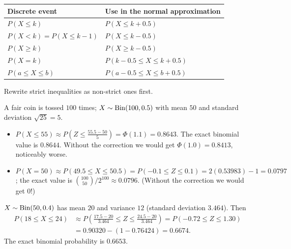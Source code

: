 \begin{important}
\begin{center}
\begin{tabular}{ll}
\toprule
Discrete event & Use in the normal approximation \\
\midrule
$P(X\le k)$ & $P(X\le k+0.5)$ \\
$P(X < k) = P(X\le k-1)$ & $P(X\le k-0.5)$ \\
$P(X\ge k)$ & $P(X\ge k-0.5)$ \\
$P(X = k)$ & $P(k-0.5\le X\le k+0.5)$ \\
$P(a\le X\le b)$ & $P(a-0.5\le X\le b+0.5)$ \\
\bottomrule
\end{tabular}
\end{center}
Rewrite strict inequalities as non-strict ones first.
\end{important}

\begin{example}
A fair coin is tossed $100$ times; $X\sim\operatorname{Bin}(100, 0.5)$ with mean $50$ and standard
deviation $\sqrt{25} = 5$.
\begin{itemize}
  \item $P(X\le55)\approx P\left(Z\le\frac{55.5-50}{5}\right) = \Phi(1.1) = 0.8643$.
        The exact binomial value is $0.8644$. Without the correction we would get
        $\Phi(1.0) = 0.8413$, noticeably worse.
  \item $P(X = 50) \approx P(49.5\le X\le 50.5) = P(-0.1\le Z\le0.1) = 2(0.53983) - 1
        = 0.0797$; the exact value is $\binom{100}{50}/2^{100}\approx 0.0796$. (Without
        the correction we would get $0$!)
\end{itemize}
\end{example}

\begin{example}[An interval]
$X\sim\operatorname{Bin}(50, 0.4)$ has mean $20$ and variance $12$ (standard deviation $3.464$). Then
\begin{align*}
  P(18\le X\le 24) &\approx P\left(\frac{17.5-20}{3.464}\le Z\le\frac{24.5-20}{3.464}\right)
  = P(-0.72\le Z\le 1.30) \\
  &= 0.90320 - (1-0.76424) = 0.6674.
\end{align*}
The exact binomial probability is $0.6653$.
\end{example}

